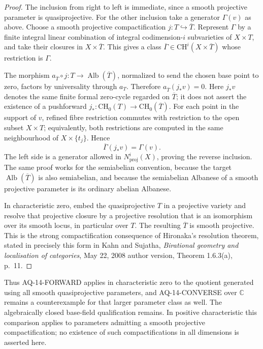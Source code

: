 \begin{proof}
The inclusion from right to left is immediate, since a
smooth projective parameter is quasiprojective. For the
other inclusion take a generator $\Gamma(v)$ as above.
Choose a smooth projective compactification
$j:T\hookrightarrow\overline T$. Represent $\Gamma$ by
a finite integral linear combination of integral
codimension-$i$ subvarieties of $X\times T$, and take
their closures in $X\times\overline T$. This gives a class
$\overline\Gamma\in\mathrm{CH}^i(X\times\overline T)$
whose restriction is $\Gamma$.

The morphism $a_{\overline T}\circ j:T\to
\operatorname{Alb}(\overline T)$, normalized to send the
chosen base point to zero, factors by universality through
$a_T$. Therefore
$a_{\overline T}(j_*v)=0$. Here $j_*v$ denotes the same
finite formal zero-cycle regarded on $\overline T$;
it does not assert the existence of a pushforward
$j_*:\mathrm{CH}_0(T)\to\mathrm{CH}_0(\overline T)$.
For each point in the support of $v$, refined fibre
restriction commutes with restriction to the open subset
$X\times T$; equivalently, both restrictions are computed
in the same neighbourhood of $X\times\{t_j\}$. Hence
\[
 \overline\Gamma(j_*v)=\Gamma(v).
\]
The left side is a generator allowed in
$N^i_{\mathrm{proj}}(X)$, proving the reverse inclusion.
The same proof works for the semiabelian convention,
because the target $\operatorname{Alb}(\overline T)$ is
also semiabelian, and because the semiabelian Albanese
of a smooth projective parameter is its ordinary
abelian Albanese.

In characteristic zero, embed the quasiprojective $T$
in a projective variety and resolve that projective
closure by a projective resolution that is an
isomorphism over its smooth locus, in particular over
$T$. The resulting $\overline T$ is smooth projective.
This is the strong compactification consequence of
Hironaka's resolution theorem, stated in precisely
this form in Kahn and Sujatha, \emph{Birational geometry
and localisation of categories}, May 22, 2008 author
version, Theorem 1.6.3(a), p.~11.
\end{proof}

Thus AQ-14-FORWARD applies in characteristic zero to the
quotient generated using all smooth quasiprojective
parameters, and AQ-14-CONVERSE over $\mathbb C$ remains
a counterexample for that larger parameter class as
well. The algebraically closed base-field qualification
remains. In positive characteristic this comparison
applies to parameters admitting a smooth projective
compactification; no existence of such compactifications
in all dimensions is asserted here.
